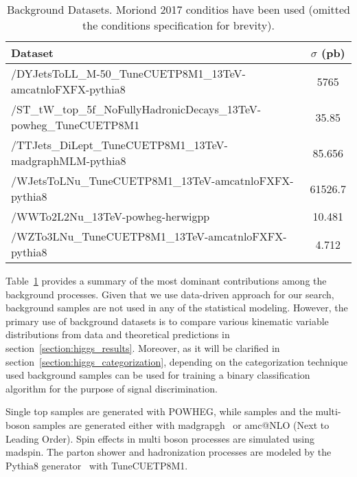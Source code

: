 \begin{table}[!h]
    \caption{Background Datasets. Moriond 2017 conditios have been used (omitted the conditions specification for brevity).}
    \label{table:higgs_data_backgrounddatasets}
    \begin{center}
        \begin{tabular}{ l  c}
            \hline
            Dataset & $\sigma$ (pb)\\
            \hline
            /DYJetsToLL\_M-50\_TuneCUETP8M1\_13TeV-amcatnloFXFX-pythia8 & 5765\\
            /ST\_tW\_top\_5f\_NoFullyHadronicDecays\_13TeV-powheg\_TuneCUETP8M1 & 35.85\\
            /TTJets\_DiLept\_TuneCUETP8M1\_13TeV-madgraphMLM-pythia8 & 85.656\\
            /WJetsToLNu\_TuneCUETP8M1\_13TeV-amcatnloFXFX-pythia8 & 61526.7\\
            /WWTo2L2Nu\_13TeV-powheg-herwigpp & 10.481\\
            /WZTo3LNu\_TuneCUETP8M1\_13TeV-amcatnloFXFX-pythia8 & 4.712\\
            \hline
        \end{tabular}
    \end{center}
\end{table}

Table~\ref{table:higgs_data_backgrounddatasets} provides a summary of the most dominant contributions among the background processes. Given that we use data-driven approach for our search, background samples are not used in any of the statistical modeling. However, the primary use of background datasets is to compare various kinematic variable distributions from data and theoretical predictions in section~\ref{section:higgs_results}. Moreover, as it will be clarified in section~\ref{section:higgs_categorization}, depending on the categorization technique used background samples can be used for training a binary classification algorithm for the purpose of signal discrimination.

Single top samples are generated with {\sc POWHEG}, while \ttbar samples and the multi-boson samples are generated either with {\sc madgrapgh}~\cite{Alwall:2011uj} or {amc@NLO (Next to Leading Order)}. Spin effects in multi boson processes are simulated using madspin. The parton shower and hadronization processes are modeled by the {\sc Pythia8} generator~\cite{Sjostrand:2007gs} with TuneCUETP8M1.


